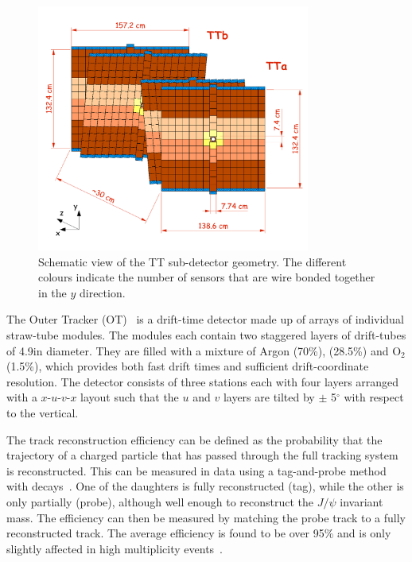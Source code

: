 \begin{figure}[!tb]
\centering
\includegraphics[width=0.8\textwidth]{figs/detector/tt.pdf}
\caption{Schematic view of the TT sub-detector geometry. The different colours indicate the number of sensors that are wire bonded together in the $y$ direction.}
\label{fig:tt}
\end{figure}

The Outer Tracker (OT)~\cite{LHCb-TDR-006,LHCb-DP-2013-003,LHCb-DP-2014-002} is a drift-time detector made up of arrays of individual straw-tube modules. The modules each contain two staggered layers of drift-tubes of 4.9\mm in diameter. They are filled with a mixture of Argon (70\%), \cotwo (28.5\%) and $\mathrm{O}_{2}$ (1.5\%), which provides both fast drift times and sufficient drift-coordinate resolution. The detector consists of three stations each with four layers arranged with a \mbox{$x$-$u$-$v$-$x$} layout such that the $u$ and $v$ layers are tilted by $\pm$ 5$^{\circ}$ with respect to the vertical.

The track reconstruction efficiency can be defined as the probability that the trajectory of a charged particle that has passed through the full tracking system is reconstructed. This can be measured in data using a tag-and-probe method with \decay{\jpsi}{\mumu} decays~\cite{LHCb-DP-2013-002}. One of the daughters is fully reconstructed (tag), while the other is only partially (probe), although well enough to reconstruct the $J/\psi$ invariant mass.  The efficiency can then be measured by matching the probe track to a fully reconstructed track. The average efficiency is found to be over 95\% and is only slightly affected in high multiplicity events~\cite{LHCb-DP-2013-002}.

